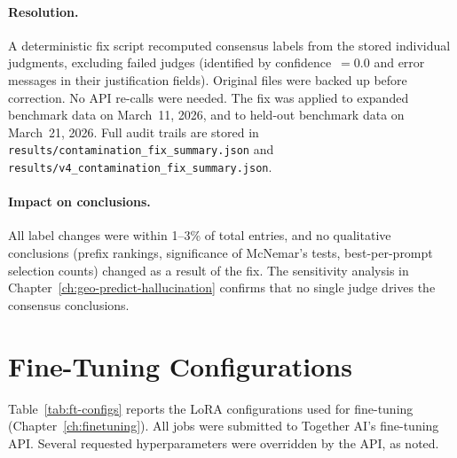 \paragraph{Resolution.} A deterministic fix script recomputed consensus labels from the stored individual judgments, excluding failed judges (identified by confidence~$=0.0$ and error messages in their justification fields).  Original files were backed up before correction.  No API re-calls were needed.  The fix was applied to expanded benchmark data on March~11, 2026, and to held-out benchmark data on March~21, 2026.  Full audit trails are stored in \texttt{results/contamination\_fix\_summary.json} and \texttt{results/v4\_contamination\_fix\_summary.json}.

\paragraph{Impact on conclusions.} All label changes were within 1--3\% of total entries, and no qualitative conclusions (prefix rankings, significance of McNemar's tests, best-per-prompt selection counts) changed as a result of the fix.  The sensitivity analysis in Chapter~\ref{ch:geo-predict-hallucination} confirms that no single judge drives the consensus conclusions.


\section{Fine-Tuning Configurations}
\label{app:ft-configs}

Table~\ref{tab:ft-configs} reports the LoRA configurations used for fine-tuning (Chapter~\ref{ch:finetuning}). All jobs were submitted to Together AI's fine-tuning API. Several requested hyperparameters were overridden by the API, as noted.

